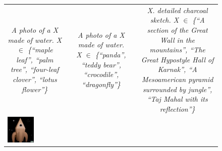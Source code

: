 \begin{figure}[ht!]
\begin{adjustwidth}{-0.8in}{-0.5in}
\begin{tabular}{cccccccccccccccccccc}
\multicolumn{6}{p{\thirdcolwidth\textwidth}}{\textit{\tiny A photo of a X made of water. \textit{X} $\in$ \{\textit{``maple leaf'', ``palm tree'', ``four-leaf clover'', ``lotus flower''}\}}} && 
\multicolumn{6}{p{\thirdcolwidth\textwidth}}{\textit{\tiny A photo of a X made of water. \textit{X} $\in$ \{\textit{``panda'', ``teddy bear'', ``crocodile'', ``dragonfly''}\}}} && 
\multicolumn{6}{p{\thirdcolwidth\textwidth}}{{\tiny \textit{X. detailed charcoal sketch. \textit{X} $\in$ \{\textit{``A section of the Great Wall in the mountains'', ``The Great Hypostyle Hall of Karnak'', ``A Mesoamerican pyramid surrounded by jungle'', ``Taj Mahal with its reflection''}\} }}} \\

\multicolumn{2}{c}{\includegraphics[width=\threebythreecolwidth\textwidth]{figures/cherries/cardboard_spaceship_0.jpg}} &

\end{tabular}
\end{adjustwidth}
\end{figure}
